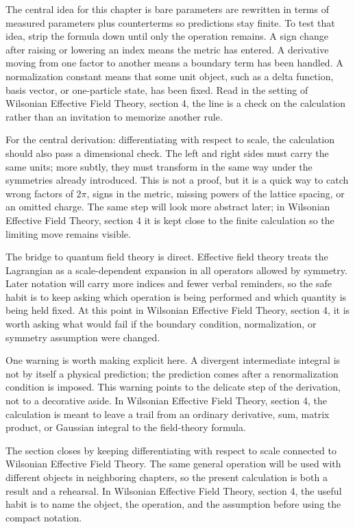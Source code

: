 The central idea for this chapter is bare parameters are rewritten in terms of measured parameters plus counterterms so predictions stay finite.  To test that idea, strip the formula down until only the operation remains.  A sign change after raising or lowering an index means the metric has entered.  A derivative moving from one factor to another means a boundary term has been handled.  A normalization constant means that some unit object, such as a delta function, basis vector, or one-particle state, has been fixed.  Read in the setting of Wilsonian Effective Field Theory, section 4, the line is a check on the calculation rather than an invitation to memorize another rule.

For the central derivation: differentiating with respect to scale, the calculation should also pass a dimensional check.  The left and right sides must carry the same units; more subtly, they must transform in the same way under the symmetries already introduced.  This is not a proof, but it is a quick way to catch wrong factors of \(2\pi\), signs in the metric, missing powers of the lattice spacing, or an omitted charge.  The same step will look more abstract later; in Wilsonian Effective Field Theory, section 4 it is kept close to the finite calculation so the limiting move remains visible.

The bridge to quantum field theory is direct.  Effective field theory treats the Lagrangian as a scale-dependent expansion in all operators allowed by symmetry.  Later notation will carry more indices and fewer verbal reminders, so the safe habit is to keep asking which operation is being performed and which quantity is being held fixed.  At this point in Wilsonian Effective Field Theory, section 4, it is worth asking what would fail if the boundary condition, normalization, or symmetry assumption were changed.

One warning is worth making explicit here.  A divergent intermediate integral is not by itself a physical prediction; the prediction comes after a renormalization condition is imposed.  This warning points to the delicate step of the derivation, not to a decorative aside.  In Wilsonian Effective Field Theory, section 4, the calculation is meant to leave a trail from an ordinary derivative, sum, matrix product, or Gaussian integral to the field-theory formula.

The section closes by keeping differentiating with respect to scale connected to Wilsonian Effective Field Theory.  The same general operation will be used with different objects in neighboring chapters, so the present calculation is both a result and a rehearsal.  In Wilsonian Effective Field Theory, section 4, the useful habit is to name the object, the operation, and the assumption before using the compact notation.



